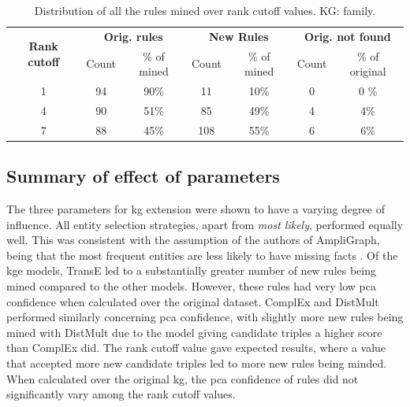 \begin{table}[htp]
\centering
\begin{tabular}{ccccccc}
\multirow{2}{*}{\textbf{Rank cutoff}} & \multicolumn{2}{c}{\textbf{Orig. rules}} & \multicolumn{2}{c}{\textbf{New Rules}}   & \multicolumn{2}{c}{\textbf{Orig. not found}} \\
                                      & Count & \multicolumn{1}{c|}{\% of mined} & Count & \multicolumn{1}{c|}{\% of mined} & Count            & \% of original            \\ \hline
\multicolumn{1}{c|}{1}                & 94    & \multicolumn{1}{c|}{90\%}        & 11    & \multicolumn{1}{c|}{10\%}        & 0                & 0 \%                        \\
\multicolumn{1}{c|}{4}                & 90    & \multicolumn{1}{c|}{51\%}        & 85    & \multicolumn{1}{c|}{49\%}        & 4                & 4\%                       \\
\multicolumn{1}{c|}{7}                & 88    & \multicolumn{1}{c|}{45\%}        & 108   & \multicolumn{1}{c|}{55\%}        & 6                & 6\%                      
\end{tabular}
\caption[Dist. of rules over rank cutoff - family KG.]{Distribution of all the rules mined over rank cutoff values. KG: family.}
\label{Tab:table_rules_ranks_family}
\end{table}
    
\subsection{Summary of effect of parameters}
The three parameters for \gls{kg} extension were shown to have a varying degree of influence. All entity selection strategies, apart from \textit{most likely}, performed equally well. This was consistent with the assumption of the authors of AmpliGraph, being that the most frequent entities are less likely to have missing facts \cite{ampligraph}. Of the \gls{kge} models, TransE led to a substantially greater number of new rules being mined compared to the other models. However, these rules had very low \gls{pca} confidence when calculated over the original dataset. ComplEx and DistMult performed similarly concerning \gls{pca} confidence, with slightly more new rules being mined with DistMult due to the model giving candidate triples a higher score than ComplEx did. The rank cutoff value gave expected results, where a value that accepted more new candidate triples led to more new rules being minded. When calculated over the original \gls{kg}, the \gls{pca} confidence of rules did not significantly vary among the rank cutoff values. 

